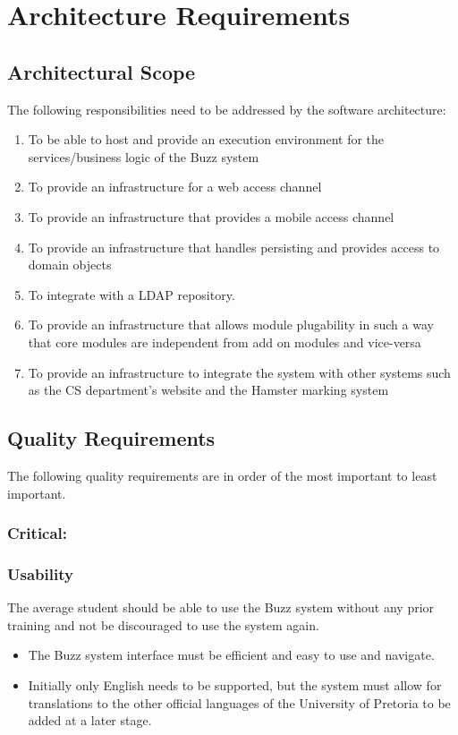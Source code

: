 \documentclass[12pt, oneside]{article}
\begin{document}
\section{Architecture Requirements}
	\subsection{Architectural Scope}
	The following responsibilities need to be addressed by the software architecture:
	\begin{enumerate}
		\item To be able to host and provide an execution environment for the services/business logic of the Buzz system
		\item To provide an infrastructure for a web access channel
		\item To provide an infrastructure that provides a mobile access channel
		\item To provide an infrastructure that handles persisting and provides access to domain objects
		\item To integrate with a LDAP repository.
		\item To provide an infrastructure that allows module plugability in such a way that core modules are independent from add on modules and vice-versa
		\item To provide an infrastructure to integrate the system with other systems such as the CS department's website and the Hamster marking system
	\end{enumerate}
	\subsection{Quality Requirements}
	
	The following quality requirements are in order of the most important to least important.	
	\subsubsection{Critical:}
	\subsubsection*{Usability}
	The average student should be able to use the Buzz system without any prior training and not be discouraged to use the system again. 
	\begin{itemize}
		\item The Buzz system interface must be efficient and easy to use and navigate.
		\item Initially only English needs to be supported, but the system must allow for translations to the other official languages of the University of Pretoria to be added at a later stage.
	\end{itemize}
	
\end{document}
